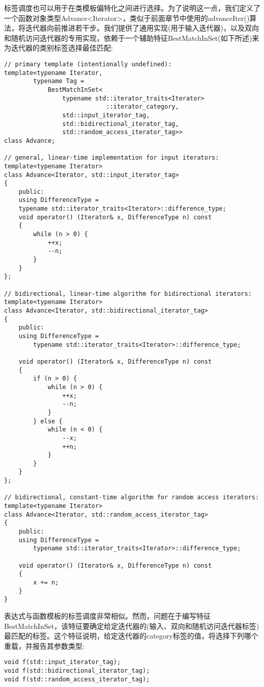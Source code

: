 
标签调度也可以用于在类模板偏特化之间进行选择。为了说明这一点，我们定义了一个函数对象类型Advance<Iterator>，类似于前面章节中使用的advanceIter()算法，将迭代器向前推进若干步。我们提供了通用实现(用于输入迭代器)，以及双向和随机访问迭代器的专用实现，依赖于一个辅助特征BestMatchInSet(如下所述)来为迭代器的类别标签选择最佳匹配:

\begin{lstlisting}[style=styleCXX]
// primary template (intentionally undefined):
template<typename Iterator,
		typename Tag =
			BestMatchInSet<
				typename std::iterator_traits<Iterator>
							::iterator_category,
				std::input_iterator_tag,
				std::bidirectional_iterator_tag,
				std::random_access_iterator_tag>>
class Advance;

// general, linear-time implementation for input iterators:
template<typename Iterator>
class Advance<Iterator, std::input_iterator_tag>
{
	public:
	using DifferenceType =
	typename std::iterator_traits<Iterator>::difference_type;
	void operator() (Iterator& x, DifferenceType n) const
	{
		while (n > 0) {
			++x;
			--n;
		}
	}
};

// bidirectional, linear-time algorithm for bidirectional iterators:
template<typename Iterator>
class Advance<Iterator, std::bidirectional_iterator_tag>
{
	public:
	using DifferenceType =
		typename std::iterator_traits<Iterator>::difference_type;
		
	void operator() (Iterator& x, DifferenceType n) const
	{
		if (n > 0) {
			while (n > 0) {
				++x;
				--n;
			}
		} else {
			while (n < 0) {
				--x;
				++n;
			}
		}
	}
};

// bidirectional, constant-time algorithm for random access iterators:
template<typename Iterator>
class Advance<Iterator, std::random_access_iterator_tag>
{
	public:
	using DifferenceType =
		typename std::iterator_traits<Iterator>::difference_type;
		
	void operator() (Iterator& x, DifferenceType n) const
	{
		x += n;
	}
}
\end{lstlisting}

表达式与函数模板的标签调度非常相似。然而，问题在于编写特征BestMatchInSet，该特征要确定给定迭代器的(输入、双向和随机访问迭代器标签)最匹配的标签。这个特征说明，给定迭代器的category标签的值，将选择下列哪个重载，并报告其参数类型:

\begin{lstlisting}[style=styleCXX]
void f(std::input_iterator_tag);
void f(std::bidirectional_iterator_tag);
void f(std::random_access_iterator_tag);
\end{lstlisting}

